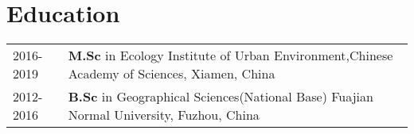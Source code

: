 \section*{Education}
\begin{tabular}{p{} p{}}
2016-2019 & \textbf{M.Sc} in Ecology \newline
       Institute of Urban Environment,Chinese Academy of Sciences, Xiamen, China \\

2012-2016 & \textbf{B.Sc} in Geographical Sciences(National Base) \newline
       Fuajian Normal University, Fuzhou, China
\end{tabular}
